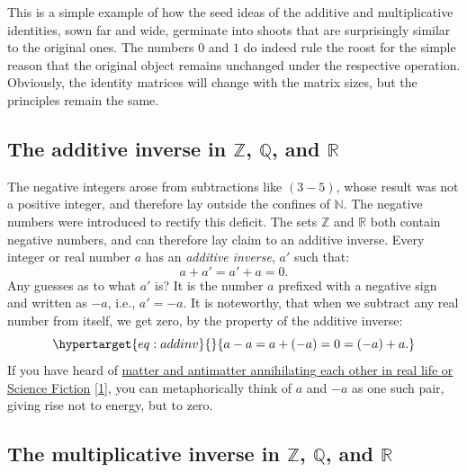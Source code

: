 \documentclass[
  a4paper,
]{article}
\begin{document}
This is a simple example of how the seed ideas of the additive and
multiplicative identities, sown far and wide, germinate into shoots that
are surprisingly similar to the original ones. The numbers \(0\) and
\(1\) do indeed rule the roost for the simple reason that the original
object remains unchanged under the respective operation. Obviously, the
identity matrices will change with the matrix sizes, but the principles
remain the same.

\hypertarget{the-additive-inverse-in-mathbbz-mathbbq-and-mathbbr}{%
\subsection{\texorpdfstring{The additive inverse in \(\mathbb{Z}\),
\(\mathbb{Q}\), and
\(\mathbb{R}\)}{The additive inverse in \textbackslash mathbb\{Z\}, \textbackslash mathbb\{Q\}, and \textbackslash mathbb\{R\}}}\label{the-additive-inverse-in-mathbbz-mathbbq-and-mathbbr}}

The negative integers arose from subtractions like \((3 - 5)\), whose
result was not a positive integer, and therefore lay outside the
confines of \(\mathbb{N}\). The negative numbers were introduced to
rectify this deficit. The sets \(\mathbb{Z}\) and \(\mathbb{R}\) both
contain negative numbers, and can therefore lay claim to an additive
inverse. Every integer or real number \(a\) has an \emph{additive
inverse}, \(a'\) such that: \[
a + a' = a' + a = 0.
\] Any guesses as to what \(a'\) is? It is the number \(a\) prefixed
with a negative sign and written as \(-a\), i.e., \(a' = -a\). It is
noteworthy, that when we subtract any real number from itself, we get
zero, by the property of the additive inverse:
\begin{equation}\protect\hypertarget{eq:addinv}{}{
a - a = a + (-a) = 0 = (-a) + a.
}\label{eq:addinv}\end{equation} If you have heard of
\href{https://www.symmetrymagazine.org/article/september-2008/antimatters-science-fiction-debut?language_content_entity=und}{matter
and antimatter annihilating each other in real life or Science Fiction}
{[}\protect\hyperlink{ref-antimatter2008}{1}{]}, you can metaphorically
think of \(a\) and \(-a\) as one such pair, giving rise not to energy,
but to zero. \normalfont

\hypertarget{the-multiplicative-inverse-in-mathbbz-mathbbq-and-mathbbr}{%
\subsection{\texorpdfstring{The multiplicative inverse in
\(\mathbb{Z}\), \(\mathbb{Q}\), and
\(\mathbb{R}\)}{The multiplicative inverse in \textbackslash mathbb\{Z\}, \textbackslash mathbb\{Q\}, and \textbackslash mathbb\{R\}}}\label{the-multiplicative-inverse-in-mathbbz-mathbbq-and-mathbbr}}
\end{document}
